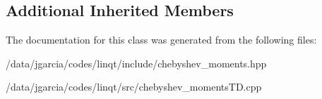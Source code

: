 \subsection*{Additional Inherited Members}


The documentation for this class was generated from the following files\+:\begin{DoxyCompactItemize}
\item 
/data/jgarcia/codes/linqt/include/chebyshev\+\_\+moments.\+hpp\item 
/data/jgarcia/codes/linqt/src/chebyshev\+\_\+moments\+T\+D.\+cpp\end{DoxyCompactItemize}
